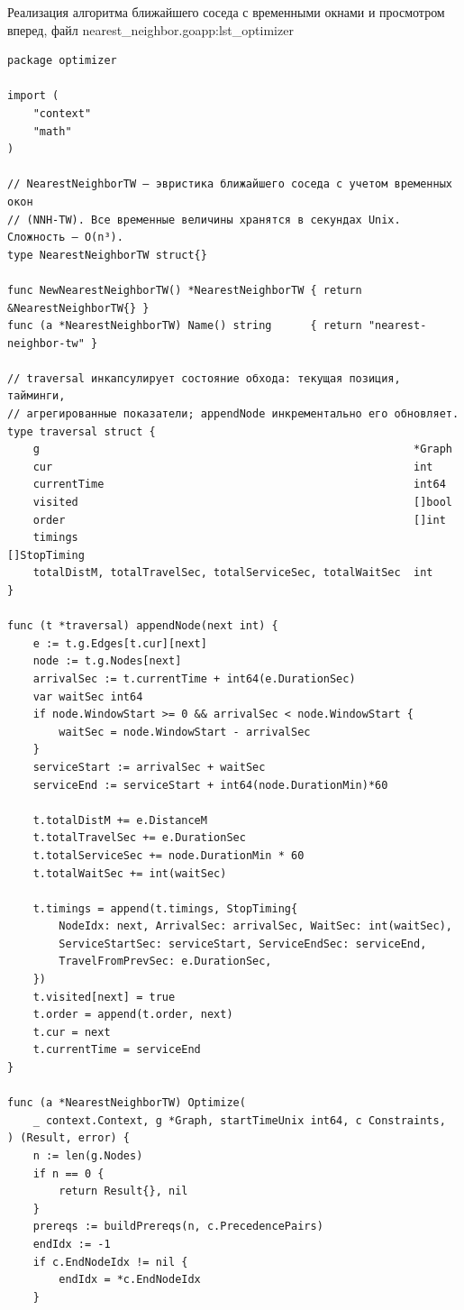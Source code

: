 \begin{codelisting}{Реализация алгоритма ближайшего соседа с временными окнами и просмотром вперед, файл nearest\_neighbor.go}{app:lst_optimizer}
  \begin{verbatim}
package optimizer

import (
    "context"
    "math"
)

// NearestNeighborTW — эвристика ближайшего соседа с учетом временных окон
// (NNH-TW). Все временные величины хранятся в секундах Unix. Сложность — O(n³).
type NearestNeighborTW struct{}

func NewNearestNeighborTW() *NearestNeighborTW { return &NearestNeighborTW{} }
func (a *NearestNeighborTW) Name() string      { return "nearest-neighbor-tw" }

// traversal инкапсулирует состояние обхода: текущая позиция, тайминги,
// агрегированные показатели; appendNode инкрементально его обновляет.
type traversal struct {
    g                                                          *Graph
    cur                                                        int
    currentTime                                                int64
    visited                                                    []bool
    order                                                      []int
    timings                                                    []StopTiming
    totalDistM, totalTravelSec, totalServiceSec, totalWaitSec  int
}

func (t *traversal) appendNode(next int) {
    e := t.g.Edges[t.cur][next]
    node := t.g.Nodes[next]
    arrivalSec := t.currentTime + int64(e.DurationSec)
    var waitSec int64
    if node.WindowStart >= 0 && arrivalSec < node.WindowStart {
        waitSec = node.WindowStart - arrivalSec
    }
    serviceStart := arrivalSec + waitSec
    serviceEnd := serviceStart + int64(node.DurationMin)*60

    t.totalDistM += e.DistanceM
    t.totalTravelSec += e.DurationSec
    t.totalServiceSec += node.DurationMin * 60
    t.totalWaitSec += int(waitSec)

    t.timings = append(t.timings, StopTiming{
        NodeIdx: next, ArrivalSec: arrivalSec, WaitSec: int(waitSec),
        ServiceStartSec: serviceStart, ServiceEndSec: serviceEnd,
        TravelFromPrevSec: e.DurationSec,
    })
    t.visited[next] = true
    t.order = append(t.order, next)
    t.cur = next
    t.currentTime = serviceEnd
}

func (a *NearestNeighborTW) Optimize(
    _ context.Context, g *Graph, startTimeUnix int64, c Constraints,
) (Result, error) {
    n := len(g.Nodes)
    if n == 0 {
        return Result{}, nil
    }
    prereqs := buildPrereqs(n, c.PrecedencePairs)
    endIdx := -1
    if c.EndNodeIdx != nil {
        endIdx = *c.EndNodeIdx
    }


\end{verbatim}
\end{codelisting}
